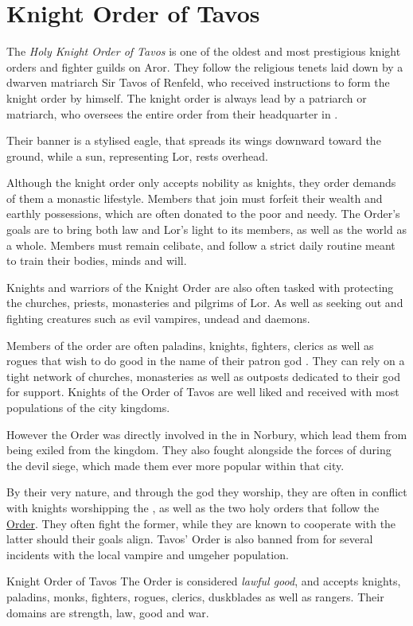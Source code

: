 \section{Knight Order of Tavos}
\label{sec:Knight Order of Tavos}

The \emph{Holy Knight Order of Tavos} is one of the oldest and most
prestigious knight orders and fighter guilds on Aror. They follow the
religious tenets laid down by a dwarven matriarch Sir Tavos of Renfeld, who
received instructions to form the knight order by  himself.
The knight order is always lead by a patriarch or matriarch, who oversees the
entire order from their headquarter in .

Their banner is a stylised eagle, that spreads its wings downward toward the
ground, while a sun, representing Lor, rests overhead.

Although the knight order only accepts nobility as knights, they order demands
of them a monastic lifestyle. Members that join must forfeit their wealth and
earthly possessions, which are often donated to the poor and needy. The
Order's goals are to bring both law and Lor's light to its members, as well as
the world as a whole. Members must remain celibate, and follow a strict daily
routine meant to train their bodies, minds and will.

Knights and warriors of the Knight Order are also often tasked with protecting
the churches, priests, monasteries and pilgrims of Lor. As well as seeking out
and fighting creatures such as evil vampires, undead and daemons.

Members of the order are often paladins, knights, fighters, clerics as well as
rogues that wish to do good in the name of their patron god .
They can rely on a tight network of churches, monasteries as well as outposts
dedicated to their god for support. Knights of the Order of Tavos are well liked
and received with most populations of the city kingdoms.

However the Order was directly involved in the 
in Norbury, which lead them from being exiled from the kingdom. They also fought
alongside the forces of  during the devil siege, which made
them ever more popular within that city.

By their very nature, and through the god they worship, they are often in
conflict with knights worshipping the , as well as
the two holy orders that follow the \hyperref[sec:Order]{Order}. They often
fight the former, while they are known to cooperate with the latter should
their goals align. Tavos' Order is also banned from 
for several incidents with the local vampire and umgeher population.

\begin{35e}{Knight Order of Tavos}
  The Order is considered \emph{lawful good}, and accepts knights, paladins,
  monks, fighters, rogues, clerics, duskblades as well as rangers. Their domains
  are strength, law, good and war.
\end{35e}
